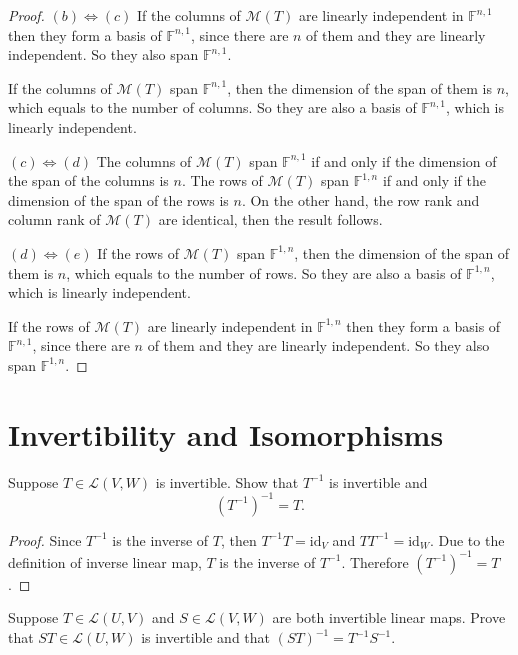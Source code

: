 \begin{proof}
    $(b) \Leftrightarrow (c)$ If the columns of $\mathcal{M}(T)$ are linearly independent in $\mathbb{F}^{n,1}$ then they form a basis of $\mathbb{F}^{n,1}$, since there are $n$ of them and they are linearly independent. So they also span $\mathbb{F}^{n,1}$.

    If the columns of $\mathcal{M}(T)$ span $\mathbb{F}^{n,1}$, then the dimension of the span of them is $n$, which equals to the number of columns. So they are also a basis of $\mathbb{F}^{n,1}$, which is linearly independent.

    $(c) \Leftrightarrow (d)$ The columns of $\mathcal{M}(T)$ span $\mathbb{F}^{n,1}$ if and only if the dimension of the span of the columns is $n$. The rows of $\mathcal{M}(T)$ span $\mathbb{F}^{1,n}$ if and only if the dimension of the span of the rows is $n$. On the other hand, the row rank and column rank of $\mathcal{M}(T)$ are identical, then the result follows.

    $(d) \Leftrightarrow (e)$ If the rows of $\mathcal{M}(T)$ span $\mathbb{F}^{1,n}$, then the dimension of the span of them is $n$, which equals to the number of rows. So they are also a basis of $\mathbb{F}^{1,n}$, which is linearly independent.

    If the rows of $\mathcal{M}(T)$ are linearly independent in $\mathbb{F}^{1,n}$ then they form a basis of $\mathbb{F}^{n,1}$, since there are $n$ of them and they are linearly independent. So they also span $\mathbb{F}^{1,n}$.
\end{proof}
\newpage

\section{Invertibility and Isomorphisms}

\begin{exercise}\label{chapter3:sectionD:exercise1}
    Suppose $T \in \mathcal{L}(V, W)$ is invertible. Show that $T^{-1}$ is invertible and
    \[
        {\left(T^{-1}\right)}^{-1} = T.
    \]
\end{exercise}

\begin{proof}
    Since $T^{-1}$ is the inverse of $T$, then $T^{-1}T = \text{id}_{V}$ and $TT^{-1} = \text{id}_{W}$. Due to the definition of inverse linear map, $T$ is the inverse of $T^{-1}$. Therefore ${\left(T^{-1}\right)}^{-1} = T$.
\end{proof}
\newpage

\begin{exercise}
    Suppose $T\in \mathcal{L}(U, V)$ and $S \in \mathcal{L}(V, W)$ are both invertible linear maps. Prove that $ST\in \mathcal{L}(U, W)$ is invertible and that ${(ST)}^{-1} = T^{-1}S^{-1}$.
\end{exercise}

